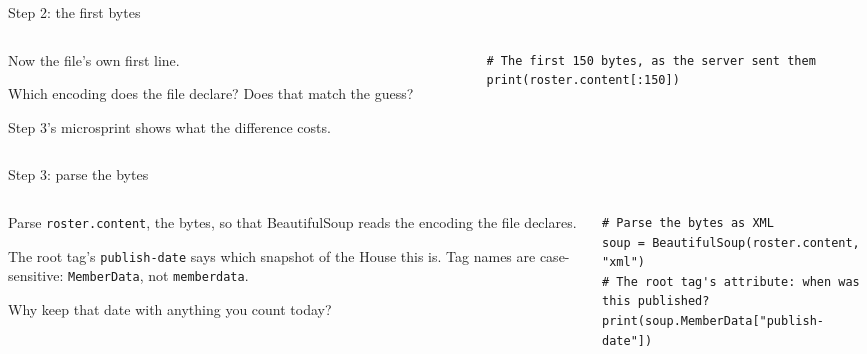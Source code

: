 \documentclass[9pt,aspectratio=169]{beamer}
\begin{document}
\begin{frame}[fragile]{Step 2: the first bytes}
    \begin{columns}[T]
        \begin{column}{0.37\textwidth}
            Now the file's own first line.

            \medskip
            Which encoding does the file declare? Does that match the guess?

            \medskip
            Step 3's microsprint shows what the difference costs.
        \end{column}
        \begin{column}{0.6\textwidth}
\begin{lstlisting}
# The first 150 bytes, as the server sent them
print(roster.content[:150])
\end{lstlisting}
        \end{column}
    \end{columns}
\end{frame}

\begin{frame}[fragile]{Step 3: parse the bytes}
    \begin{columns}[T]
        \begin{column}{0.37\textwidth}
            Parse \texttt{roster.content}, the bytes, so that BeautifulSoup reads the encoding the file declares.

            \medskip
            The root tag's \texttt{publish-date} says which snapshot of the House this is. Tag names are case-sensitive: \texttt{MemberData}, not \texttt{memberdata}.

            \medskip
            Why keep that date with anything you count today?
        \end{column}
        \begin{column}{0.6\textwidth}
\begin{lstlisting}
# Parse the bytes as XML
soup = BeautifulSoup(roster.content, "xml")
# The root tag's attribute: when was this published?
print(soup.MemberData["publish-date"])
\end{lstlisting}
        \end{column}
    \end{columns}
\end{frame}
\end{document}
